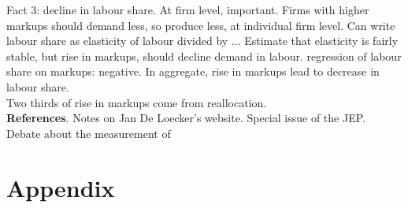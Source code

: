 \documentclass{amsart}
\theoremstyle{definition}
\theoremstyle{remark}
\numberwithin{equation}{section}
\begin{document}
Fact 3: decline in labour share. At firm level, important. Firms with higher markups should demand less, so produce less, at individual firm level. Can write labour share as elasticity of labour divided by ... Estimate that elasticity is fairly stable, but rise in markups, should decline demand in labour. regression of labour share on markups: negative. In aggregate, rise in markups lead to decrease in labour share.\\

Two thirds of rise in markups come from reallocation.\\





\textbf{References}. Notes on Jan De Loecker's website. Special issue of the JEP.\\


Debate about the measurement of 

\newpage




\newpage

\section*{Appendix}
\end{document}
